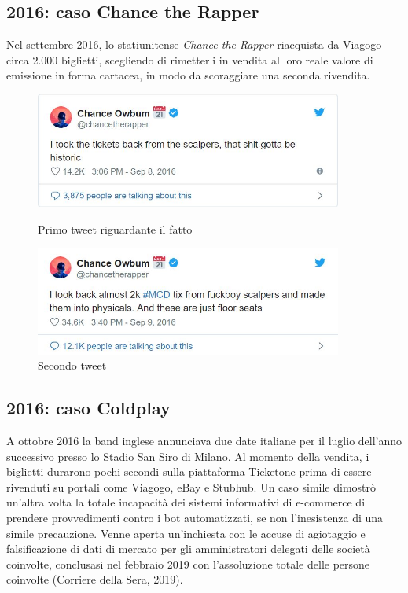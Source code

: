 \subsection{2016: caso Chance the Rapper}
Nel settembre 2016, lo statiunitense \textit{Chance the Rapper} riacquista da Viagogo circa 2.000 biglietti, scegliendo di rimetterli in vendita al loro reale valore di emissione in forma cartacea, in modo da scoraggiare una seconda rivendita. 
\begin{figure}[htbp]
    \centering
    \begin{minipage}{0.45\textwidth}
        \centering
        \includegraphics[width=0.9\textwidth]{chapter2/immagini/chance1} %
        \caption{Primo tweet riguardante il fatto}
    \end{minipage}\hfill
    \begin{minipage}{0.45\textwidth}
        \centering
        \includegraphics[width=0.9\textwidth]{chapter2/immagini/chance2} %
        \caption{Secondo tweet}
    \end{minipage}
\end{figure}

\subsection{2016: caso Coldplay}
A ottobre 2016 la band inglese annunciava due date italiane per il luglio dell'anno successivo presso lo Stadio San Siro di Milano. Al momento della vendita, i biglietti durarono pochi secondi sulla piattaforma Ticketone prima di essere rivenduti su portali come Viagogo, eBay e Stubhub. Un caso simile dimostrò un'altra volta la totale incapacità dei sistemi informativi di e-commerce di prendere provvedimenti contro i bot automatizzati, se non l'inesistenza di una simile precauzione.
Venne aperta un'inchiesta con le accuse di agiotaggio e falsificazione di dati di mercato per gli amministratori delegati delle società coinvolte, conclusasi nel febbraio 2019 con l'assoluzione totale delle persone coinvolte (Corriere della Sera, 2019). 


